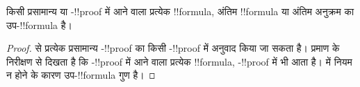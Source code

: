 \documentclass[../../../include/open-logic-section]{subfiles}
\begin{document}
\begin{cor}
किसी प्रसामान्य  या -!!{proof} में आने वाला प्रत्येक
!!{formula}, अंतिम !!{formula} या अंतिम अनुक्रम का उप-!!{formula} है।
\end{cor}

\begin{proof}
   से प्रत्येक प्रसामान्य -!!{proof}
  का किसी -!!{proof} में अनुवाद किया जा सकता है। प्रमाण के निरीक्षण
  से दिखता है कि -!!{proof} में आने वाला प्रत्येक !!{formula},
  -!!{proof} में भी आता है।  में \Cut{} नियम न होने के कारण
  उप-!!{formula} गुण है।
\end{proof}
\end{document}
